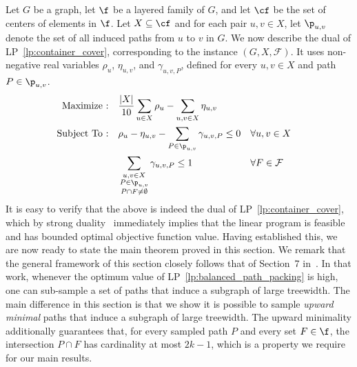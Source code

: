 Let $G$ be a graph, let $\f$ be a layered family of $G$, and let $\cf$ be the set of centers of elements in $\f$. Let $X \subseteq \cf$ and for each pair $u, v \in X$, let $\p_{u,v}$ denote the set of all induced paths from $u$ to $v$ in $G$. We now describe the dual of LP~\ref{lp:container_cover}, corresponding to the instance $(G, X, \mathcal{F})$. It uses non-negative real variables $\rho_u$, $\eta_{u,v}$, and $\gamma_{u,v,P}$, defined for every $u,v \in X$ and path $P \in \p_{u,v}$.
% 
\begin{align}\label{lp:balanced_path_packing}
    \text{Maximize :}&\quad \frac{|X|}{10}\sum\limits_{u\in X} \rho_u - \sum\limits_{u,v \in X}\eta_{u,v}\\
    \nonumber \text{Subject To :}&\quad \rho_u - \eta_{u,v} - \sum\limits_{P\in\p_{u,v}}\gamma_{u,v,P} \leq 0 && \forall u,v \in X\\
    \nonumber &\quad \sum\limits_{\substack{u,v \in X\\ P\in \p_{u,v}\\ P\cap F\neq \emptyset}} \gamma_{u,v,P} \leq 1 && \forall F\in \mathcal{F}
\end{align}
% 
It is easy to verify that the above is indeed the dual of LP~\ref{lp:container_cover}, which by strong duality~\cite{doi:10.1137/1025101} immediately implies that the linear program is feasible and has bounded optimal objective function value. Having established this, we are now ready to state the main theorem proved in this section. We remark that the general framework of this section closely follows that of Section~7 in~\cite{chudnovsky2025treewidth}. In that work, whenever the optimum value of LP~\ref{lp:balanced_path_packing} is high, one can sub-sample a set of paths that induce a subgraph of large treewidth. The main difference in this section is that we show it is possible to sample \emph{upward minimal} paths that induce a subgraph of large treewidth. The upward minimality additionally guarantees that, for every sampled path $P$ and every set $F \in \f$, the intersection $P \cap F$ has cardinality at most $2k-1$, which is a property we require for our main results.

